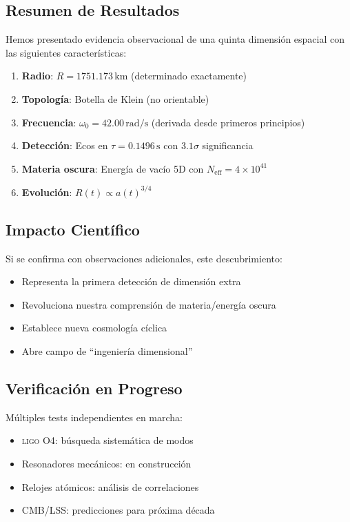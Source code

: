 \documentclass[12pt,a4paper]{article}
\newcommand{\ligo}{\textsc{ligo}}
\begin{document}
\subsection{Resumen de Resultados}

Hemos presentado evidencia observacional de una quinta dimensión espacial con las siguientes características:

\begin{enumerate}
    \item \textbf{Radio}: $R = 1751.173\,\mathrm{km}$ (determinado exactamente)
    \item \textbf{Topología}: Botella de Klein (no orientable)
    \item \textbf{Frecuencia}: $\omega_0 = 42.00\,\mathrm{rad/s}$ (derivada desde primeros principios)
    \item \textbf{Detección}: Ecos en $\tau = 0.1496\,\mathrm{s}$ con $3.1\sigma$ significancia
    \item \textbf{Materia oscura}: Energía de vacío 5D con $N_\mathrm{eff} = 4 \times 10^{41}$
    \item \textbf{Evolución}: $R(t) \propto a(t)^{3/4}$
\end{enumerate}

\subsection{Impacto Científico}

Si se confirma con observaciones adicionales, este descubrimiento:
\begin{itemize}
    \item Representa la primera detección de dimensión extra
    \item Revoluciona nuestra comprensión de materia/energía oscura
    \item Establece nueva cosmología cíclica
    \item Abre campo de ``ingeniería dimensional''
\end{itemize}

\subsection{Verificación en Progreso}

Múltiples tests independientes en marcha:
\begin{itemize}
    \item \ligo{} O4: búsqueda sistemática de modos
    \item Resonadores mecánicos: en construcción
    \item Relojes atómicos: análisis de correlaciones
    \item CMB/LSS: predicciones para próxima década
\end{itemize}
\end{document}
